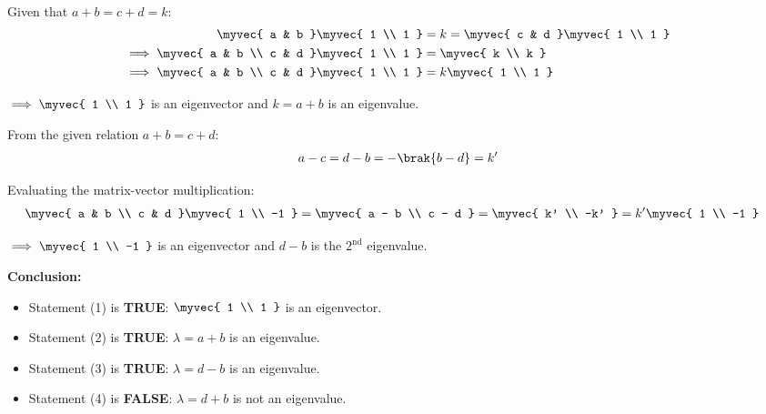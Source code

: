 \begin{enumerate}
\solution \\ 

\noindent Given that $a + b = c + d = k$:
\begin{align}
\myvec{ a & b } \myvec{ 1 \\ 1 } &= k = \myvec{ c & d } \myvec{ 1 \\ 1 } \\
\implies \myvec{ a & b \\ c & d } \myvec{ 1 \\ 1 } &= \myvec{ k \\ k } \\
\implies \myvec{ a & b \\ c & d } \myvec{ 1 \\ 1 } &= k \myvec{ 1 \\ 1 }
\end{align}

\noindent $\implies \myvec{ 1 \\ 1 }$ is an eigenvector and $k = a + b$ is an eigenvalue.

\vspace{0.5cm}


\noindent From the given relation $a + b = c + d$:
\begin{align}
a - c = d - b = -\brak{b - d} = k'
\end{align}

\noindent Evaluating the matrix-vector multiplication:
\begin{align}
\myvec{ a & b \\ c & d } \myvec{ 1 \\ -1 } &= \myvec{ a - b \\ c - d } = \myvec{ k' \\ -k' } = k' \myvec{ 1 \\ -1 }
\end{align}

\noindent $\implies \myvec{ 1 \\ -1 }$ is an eigenvector and $d - b$ is the $2^{\text{nd}}$ eigenvalue.

\vspace{0.5cm}

\noindent \textbf{Conclusion:}
\begin{itemize}
    \item Statement (1) is \textbf{TRUE}: $\myvec{ 1 \\ 1 }$ is an eigenvector.
    \item Statement (2) is \textbf{TRUE}: $\lambda = a + b$ is an eigenvalue.
    \item Statement (3) is \textbf{TRUE}: $\lambda = d - b$ is an eigenvalue.
    \item Statement (4) is \textbf{FALSE}: $\lambda = d + b$ is not an eigenvalue.
\end{itemize}


\end{enumerate}
